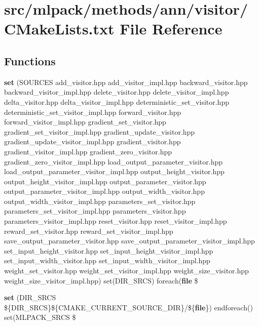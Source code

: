 \section{src/mlpack/methods/ann/visitor/\+C\+Make\+Lists.txt File Reference}
\label{methods_2ann_2visitor_2CMakeLists_8txt}
\subsection*{Functions}
\begin{DoxyCompactItemize}
\item 
{\bf set} (S\+O\+U\+R\+C\+ES add\+\_\+visitor.\+hpp add\+\_\+visitor\+\_\+impl.\+hpp backward\+\_\+visitor.\+hpp backward\+\_\+visitor\+\_\+impl.\+hpp delete\+\_\+visitor.\+hpp delete\+\_\+visitor\+\_\+impl.\+hpp delta\+\_\+visitor.\+hpp delta\+\_\+visitor\+\_\+impl.\+hpp deterministic\+\_\+set\+\_\+visitor.\+hpp deterministic\+\_\+set\+\_\+visitor\+\_\+impl.\+hpp forward\+\_\+visitor.\+hpp forward\+\_\+visitor\+\_\+impl.\+hpp gradient\+\_\+set\+\_\+visitor.\+hpp gradient\+\_\+set\+\_\+visitor\+\_\+impl.\+hpp gradient\+\_\+update\+\_\+visitor.\+hpp gradient\+\_\+update\+\_\+visitor\+\_\+impl.\+hpp gradient\+\_\+visitor.\+hpp gradient\+\_\+visitor\+\_\+impl.\+hpp gradient\+\_\+zero\+\_\+visitor.\+hpp gradient\+\_\+zero\+\_\+visitor\+\_\+impl.\+hpp load\+\_\+output\+\_\+parameter\+\_\+visitor.\+hpp load\+\_\+output\+\_\+parameter\+\_\+visitor\+\_\+impl.\+hpp output\+\_\+height\+\_\+visitor.\+hpp output\+\_\+height\+\_\+visitor\+\_\+impl.\+hpp output\+\_\+parameter\+\_\+visitor.\+hpp output\+\_\+parameter\+\_\+visitor\+\_\+impl.\+hpp output\+\_\+width\+\_\+visitor.\+hpp output\+\_\+width\+\_\+visitor\+\_\+impl.\+hpp parameters\+\_\+set\+\_\+visitor.\+hpp parameters\+\_\+set\+\_\+visitor\+\_\+impl.\+hpp parameters\+\_\+visitor.\+hpp parameters\+\_\+visitor\+\_\+impl.\+hpp reset\+\_\+visitor.\+hpp reset\+\_\+visitor\+\_\+impl.\+hpp reward\+\_\+set\+\_\+visitor.\+hpp reward\+\_\+set\+\_\+visitor\+\_\+impl.\+hpp save\+\_\+output\+\_\+parameter\+\_\+visitor.\+hpp save\+\_\+output\+\_\+parameter\+\_\+visitor\+\_\+impl.\+hpp set\+\_\+input\+\_\+height\+\_\+visitor.\+hpp set\+\_\+input\+\_\+height\+\_\+visitor\+\_\+impl.\+hpp set\+\_\+input\+\_\+width\+\_\+visitor.\+hpp set\+\_\+input\+\_\+width\+\_\+visitor\+\_\+impl.\+hpp weight\+\_\+set\+\_\+visitor.\+hpp weight\+\_\+set\+\_\+visitor\+\_\+impl.\+hpp weight\+\_\+size\+\_\+visitor.\+hpp weight\+\_\+size\+\_\+visitor\+\_\+impl.\+hpp) set(D\+I\+R\+\_\+\+S\+R\+CS) foreach({\bf file} \$
\item 
{\bf set} (D\+I\+R\+\_\+\+S\+R\+CS \$\{D\+I\+R\+\_\+\+S\+R\+CS\}\$\{C\+M\+A\+K\+E\+\_\+\+C\+U\+R\+R\+E\+N\+T\+\_\+\+S\+O\+U\+R\+C\+E\+\_\+\+D\+IR\}/\$\{{\bf file}\}) endforeach() set(M\+L\+P\+A\+C\+K\+\_\+\+S\+R\+CS \$
\end{DoxyCompactItemize}


